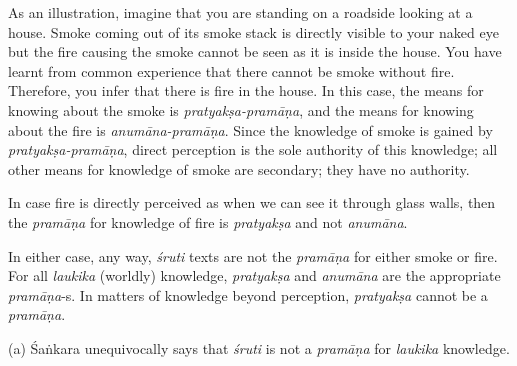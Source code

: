 As an illustration, imagine that you are standing on a roadside looking at a house. Smoke coming out of its smoke stack is directly visible to your naked eye but the fire causing the smoke cannot be seen as it is inside the house.  You have learnt from common experience that there cannot be smoke without fire.  Therefore, you infer that there is fire in the house.  In this case, the means for knowing about the smoke is {\sl pratyakṣa-pramāṇa}, and the means for knowing about the fire is {\sl anumāna-pramāṇa}.  Since the knowledge of smoke is gained by {\sl pratyakṣa-pramāṇa}, direct perception is the sole authority of this knowledge; all other means for knowledge of smoke are secondary; they have no authority.  

In case fire is directly perceived as when we can see it through glass walls, then the {\sl pramāṇa} for knowledge of fire is {\sl pratyakṣa} and not {\sl anumāna}.  

In either case, any way, {\sl śruti} texts are not the {\sl pramāṇa} for either smoke or fire.  For all {\sl laukika} (worldly) knowledge, {\sl pratyakṣa} and {\sl anumāna} are the appropriate {\sl pramāṇa}-s. In matters of knowledge beyond perception, {\sl pratyakṣa} cannot be a {\sl pramāṇa}.

(a) Śaṅkara unequivocally says that {{\sl śruti}\relax} is not a {{\sl pramāṇa}\relax} for {{\sl laukika}\relax} knowledge.

